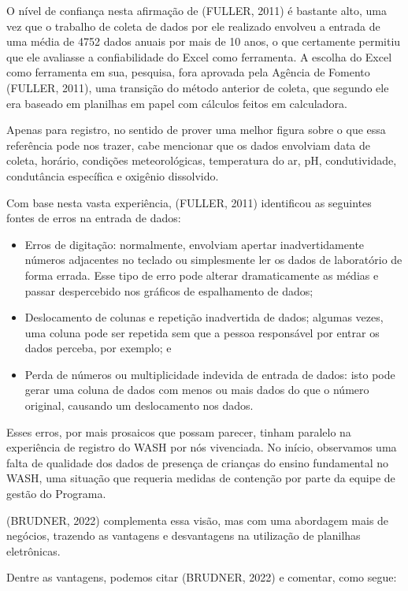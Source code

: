 O nível de confiança nesta afirmação de (FULLER, 2011) é bastante alto, uma vez que o trabalho de coleta de dados por ele realizado envolveu a entrada de uma média de 4752 dados anuais por mais de 10 anos, o que certamente permitiu que ele avaliasse a confiabilidade do Excel como ferramenta. A escolha do Excel como ferramenta em sua, pesquisa, fora aprovada pela Agência de Fomento  (FULLER, 2011), uma transição do método anterior de coleta, que segundo ele era baseado em planilhas em papel com cálculos feitos em calculadora.

Apenas para registro, no sentido de prover uma melhor figura sobre o que essa referência pode nos trazer, cabe mencionar que os dados envolviam data de coleta, horário, condições meteorológicas, temperatura do ar, pH, condutividade, condutância específica e oxigênio dissolvido.

Com base nesta vasta experiência,  (FULLER, 2011) identificou as seguintes fontes de erros na entrada de dados:


\begin{itemize}
\item Erros de digitação: normalmente, envolviam apertar inadvertidamente números adjacentes no teclado ou simplesmente ler os dados de laboratório de forma errada. Esse tipo de erro pode alterar dramaticamente as médias e passar despercebido nos gráficos de espalhamento de dados;
\item Deslocamento de colunas e repetição inadvertida de dados; algumas vezes, uma coluna pode ser repetida sem que a pessoa responsável por entrar os dados perceba, por exemplo; e
\item Perda de números ou multiplicidade indevida de entrada de dados: isto pode gerar uma coluna de dados com menos ou mais dados do que o número original, causando um deslocamento nos dados.
\end{itemize}

Esses erros, por mais prosaicos que possam parecer, tinham paralelo na experiência de registro do WASH por nós vivenciada. No início, observamos uma falta de qualidade dos dados de presença de crianças do ensino fundamental no WASH, uma situação que requeria medidas de contenção por parte da equipe de gestão do Programa.

(BRUDNER, 2022) complementa essa visão, mas com uma abordagem mais de negócios, trazendo as vantagens e desvantagens na utilização de planilhas eletrônicas.

Dentre as vantagens, podemos citar (BRUDNER, 2022) e comentar, como segue:


